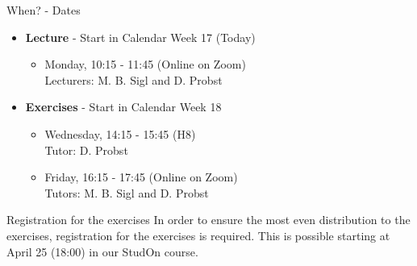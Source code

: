 \begin{frame}{When? - Dates}
	\begin{itemize}
		\item \textbf{Lecture} - Start in Calendar Week 17 (Today)
		      \begin{itemize}
			      \item Monday, 10:15 - 11:45 (Online on Zoom) \\
			            {\color{gray}Lecturers: M. B. Sigl and D. Probst}
		      \end{itemize}
		\item \textbf{Exercises} - Start in Calendar Week 18
		      \begin{itemize}
			      \item Wednesday, 14:15 - 15:45 (H8) \\
			            {\color{gray}Tutor: D. Probst}
			      \item Friday, 16:15 - 17:45 (Online on Zoom) \\
			            {\color{gray}Tutors: M. B. Sigl and D. Probst}
		      \end{itemize}
	\end{itemize}

	\begin{block}{Registration for the exercises}
		In order to ensure the most even distribution to the exercises, registration for the exercises is required. This is possible starting at April 25 (18:00) in our StudOn course.
	\end{block}
\end{frame}

